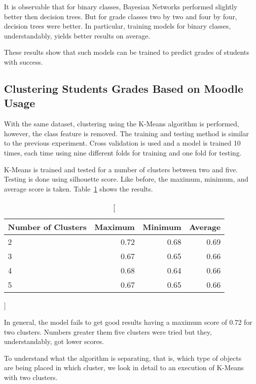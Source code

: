 It is observable that for binary classes, Bayesian Networks performed slightly
better then decision trees. But for grade classes two by two and four by four,
decision trees were better. In particular, training models for binary classes,
understandably, yields better results on average.

These results show that such models can be trained to predict grades of
students with success.

\subsection{Clustering Students Grades Based on Moodle Usage}

With the same dataset, clustering using the K-Means algorithm is performed,
however, the class feature is removed. The training and testing method is
similar to the previous experiment. Cross validation is used and a model is
trained 10 times, each time using nine different folds for training and one
fold for testing.

K-Means is trained and tested for a number of clusters between two and five.
Testing is done using silhouette score. Like before, the maximum, minimum, and
average score is taken. Table~\ref{tab:exp_002_res} shows the results.

\begin{table}[h!]
    \centering

    \begin{tabular}{| l | r | r | r |}
        \hline
        \textbf{Number of Clusters} & \textbf{Maximum} & \textbf{Minimum} & \textbf{Average} \\ \hline
        2 & 0.72 & 0.68 & 0.69 \\ \hline
        3 & 0.67 & 0.65 & 0.66 \\ \hline
        4 & 0.68 & 0.64 & 0.66 \\ \hline
        5 & 0.67 & 0.65 & 0.66 \\ \hline
    \end{tabular}

    \caption
        []
        {}

    \label{tab:exp_002_res}
\end{table}

In general, the model fails to get good results having a maximum score of 0.72
for two clusters. Numbers greater them five clusters were tried but they,
understandably, got lower scores.

To understand what the algorithm is separating, that is, which type of objects
are being placed in which cluster, we look in detail to an execution of K-Means
with two clusters.

